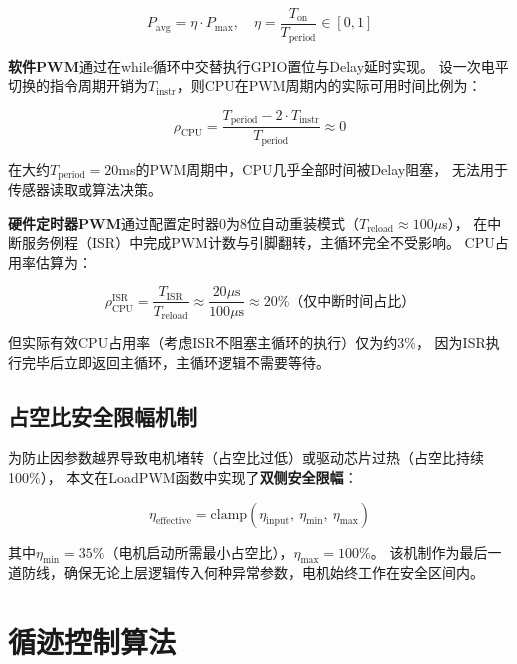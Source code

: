 \documentclass[12pt,a4paper]{ctexart}
\begin{document}
\begin{equation}
P_{\text{avg}} = \eta \cdot P_{\text{max}}, \quad \eta = \frac{T_{\text{on}}}{T_{\text{period}}} \in [0, 1]
\label{eq:pwm_power}
\end{equation}

\textbf{软件PWM}通过在while循环中交替执行GPIO置位与Delay延时实现。
设一次电平切换的指令周期开销为$T_{\text{instr}}$，则CPU在PWM周期内的实际可用时间比例为：

\begin{equation}
\rho_{\text{CPU}} = \frac{T_{\text{period}} - 2 \cdot T_{\text{instr}}}{T_{\text{period}}} \approx 0
\label{eq:cpu_usage}
\end{equation}

在大约$T_{\text{period}}=20$ms的PWM周期中，CPU几乎全部时间被Delay阻塞，
无法用于传感器读取或算法决策。

\textbf{硬件定时器PWM}通过配置定时器0为8位自动重装模式（$T_{\text{reload}} \approx 100\mu$s），
在中断服务例程（ISR）中完成PWM计数与引脚翻转，主循环完全不受影响。
CPU占用率估算为：

\begin{equation}
\rho_{\text{CPU}}^{\text{ISR}} = \frac{T_{\text{ISR}}}{T_{\text{reload}}} \approx \frac{20\mu\text{s}}{100\mu\text{s}} \approx 20\% \text{（仅中断时间占比）}
\label{eq:cpu_isr}
\end{equation}

但实际有效CPU占用率（考虑ISR不阻塞主循环的执行）仅为约3\%，
因为ISR执行完毕后立即返回主循环，主循环逻辑不需要等待。

\subsection{占空比安全限幅机制}

为防止因参数越界导致电机堵转（占空比过低）或驱动芯片过热（占空比持续100\%），
本文在LoadPWM函数中实现了\textbf{双侧安全限幅}：

\begin{equation}
\eta_{\text{effective}} = \text{clamp}(\eta_{\text{input}},\ \eta_{\min},\ \eta_{\max})
\label{eq:clamp}
\end{equation}

其中$\eta_{\min} = 35\%$（电机启动所需最小占空比），$\eta_{\max} = 100\%$。
该机制作为最后一道防线，确保无论上层逻辑传入何种异常参数，电机始终工作在安全区间内。

\section{循迹控制算法}
\end{document}
